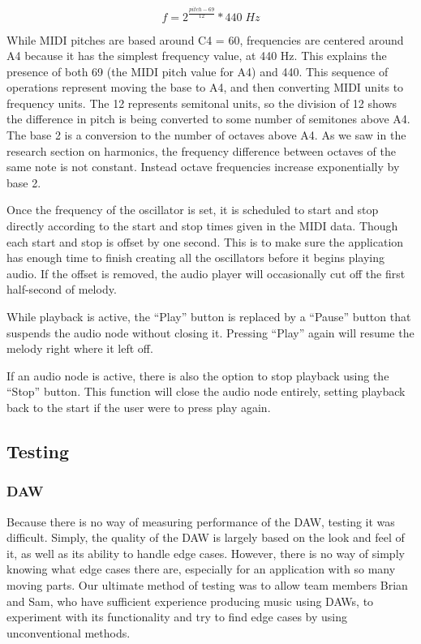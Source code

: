 \begin{equation} \label{get_frequency}
  f = 2^{\frac{pitch - 69}{12}} * 440 \;Hz
\end{equation}

While MIDI pitches are based around C4 = 60, frequencies are centered around A4 because it has the
simplest frequency value, at 440 Hz. This explains the presence of both 69 (the MIDI pitch value
for A4) and 440. This sequence of operations represent moving the base to A4, and then converting
MIDI units to frequency units. The 12 represents semitonal units, so the division of 12 shows the
difference in pitch is being converted to some number of semitones above A4. The base 2 is a
conversion to the number of octaves above A4. As we saw in the research section on harmonics, the
frequency difference between octaves of the same note is not constant. Instead octave frequencies
increase exponentially by base 2.

Once the frequency of the oscillator is set, it is scheduled to start and stop directly according
to the start and stop times given in the MIDI data. Though each start and stop is offset by one
second. This is to make sure the application has enough time to finish creating all the oscillators
before it begins playing audio. If the offset is removed, the audio player will occasionally cut
off the first half-second of melody.

While playback is active, the “Play” button is replaced by a “Pause” button that suspends the audio
node without closing it. Pressing “Play” again will resume the melody right where it left off.

If an audio node is active, there is also the option to stop playback using the “Stop” button. This
function will close the audio node entirely, setting playback back to the start if the user were to
press play again.

\subsection{Testing}

\subsubsection{DAW}

Because there is no way of measuring performance of the DAW, testing it was difficult. Simply, the
quality of the DAW is largely based on the look and feel of it, as well as its ability to handle
edge cases. However, there is no way of simply knowing what edge cases there are, especially for
an application with so many moving parts. Our ultimate method of testing was to allow team members
Brian and Sam, who have sufficient experience producing music using DAWs, to experiment with its
functionality and try to find edge cases by using unconventional methods.

